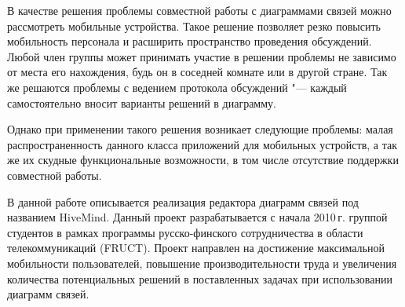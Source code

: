 В качестве решения проблемы совместной работы с диаграммами связей можно
рассмотреть мобильные устройства. Такое решение позволяет резко повысить
мобильность персонала и расширить пространство проведения обсуждений. Любой член
группы может принимать участие в решении проблемы не зависимо от места его
нахождения, будь он в соседней комнате или в другой стране. Так же решаются
проблемы с ведением протокола обсуждений "--- каждый самостоятельно вносит
варианты решений в диаграмму.

Однако при применении такого решения возникает следующие проблемы: малая
распространенность данного класса приложений для мобильных устройств, а так же
их скудные функциональные возможности, в том числе отсутствие поддержки
совместной работы.

В данной работе описывается реализация редактора диаграмм связей под названием
HiveMind. Данный проект разрабатывается с начала 2010\,г. группой студентов в
рамках программы русско-финского сотрудничества в области телекоммуникаций
(FRUCT). Проект направлен на достижение максимальной мобильности пользователей,
повышение производительности труда и увеличения количества потенциальных решений
в поставленных задачах при использовании диаграмм связей.